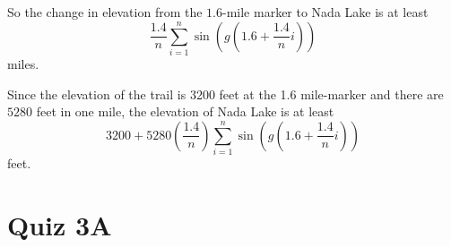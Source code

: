 \documentclass{ximera}
\begin{document}
\begin{question}
\begin{explanation}
So the change in elevation from the $1.6$-mile marker to Nada Lake is at least
\[
  \frac{1.4}{n}\sum_{i=1}^{n} \sin\left( g\left( 1.6 + \frac{1.4}{n}i \right) \right) 
\]
miles. 

Since the elevation of the trail is 3200 feet at the 1.6 mile-marker and there are $5280$ feet in one mile, the elevation of Nada Lake is at least
\[
    3200 + 5280 \left(  \frac{1.4}{n}  \right)\sum_{i=1}^{n} \sin\left( g\left( 1.6 + \frac{1.4}{n}i \right) \right)
\]
feet.

\end{explanation}


\end{question}




\section{Quiz 3A}
\end{document}
